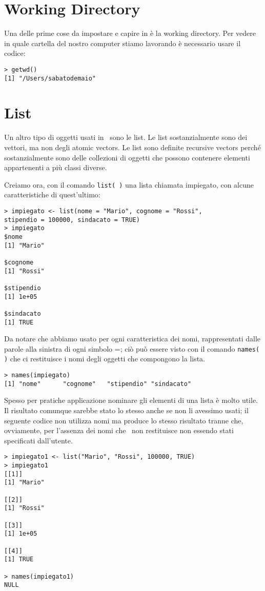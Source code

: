 \section{Working Directory}

Una delle prime cose da impostare e capire in \erre è la working directory. Per vedere in quale cartella del nostro computer stiamo lavorando è necessario usare il codice:
\begin{lstlisting}
> getwd()
[1] "/Users/sabatodemaio"
\end{lstlisting}


\section{List}
Un altro tipo di oggetti usati in \erre\ sono le list. Le list sostanzialmente sono dei vettori, ma non degli atomic vectors. Le list sono definite recursive vectors perché sostanzialmente sono delle collezioni di oggetti che possono contenere elementi appartenenti a più classi diverse.

Creiamo ora, con il comando \lstinline!list( )! una lista chiamata impiegato, con alcune caratteristiche di quest'ultimo:

\begin{lstlisting}
> impiegato <- list(nome = "Mario", cognome = "Rossi", 
stipendio = 100000, sindacato = TRUE)
> impiegato
$nome
[1] "Mario"

$cognome
[1] "Rossi"

$stipendio
[1] 1e+05

$sindacato
[1] TRUE
\end{lstlisting}

Da notare che abbiamo usato per ogni caratteristica dei nomi, rappresentati dalle parole alla sinistra di ogni simbolo =; ciò può essere visto con il comando \lstinline!names( )! che ci restituisce i nomi degli oggetti che compongono la lista.
\begin{lstlisting}
> names(impiegato)
[1] "nome"      "cognome"   "stipendio" "sindacato"
\end{lstlisting}

Spesso per pratiche applicazione nominare gli elementi di una lista è molto utile. Il risultato comunque sarebbe stato lo stesso anche se non li avessimo usati; il seguente codice non utilizza nomi ma produce lo stesso risultato tranne che, ovviamente, per l'assenza dei nomi che \erre\ non restituisce non essendo stati specificati dall'utente.
\begin{lstlisting}
> impiegato1 <- list("Mario", "Rossi", 100000, TRUE)
> impiegato1
[[1]]
[1] "Mario"

[[2]]
[1] "Rossi"

[[3]]
[1] 1e+05

[[4]]
[1] TRUE

> names(impiegato1)
NULL
\end{lstlisting}

